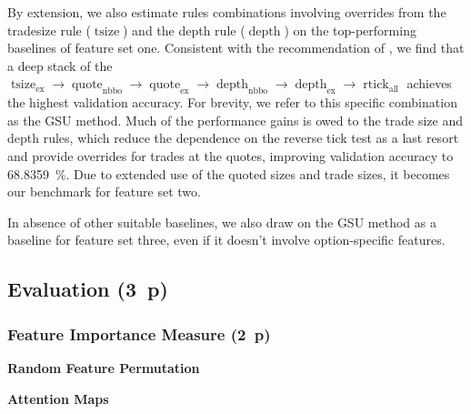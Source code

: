 By extension, we also estimate rules combinations involving overrides from the tradesize rule ($\operatorname{tsize}$) and the depth rule ($\operatorname{depth}$) on the top-performing baselines of feature set one. Consistent with the recommendation of \textcite[][14]{grauerOptionTradeClassification2022}, we find that a deep stack of the $\operatorname{tsize}_{\text{ex}} \to \operatorname{quote}_{\text{nbbo}} \to \operatorname{quote}_{\text{ex}} \to \operatorname{depth}_{\text{nbbo}} \to \operatorname{depth}_{\text{ex}} \to \operatorname{rtick}_{\text{all}}$ achieves the highest validation accuracy. For brevity, we refer to this specific combination as the \gls{GSU} method. Much of the performance gains is owed to the trade size and depth rules, which reduce the dependence on the reverse tick test as a last resort and provide overrides for trades at the quotes, improving validation accuracy to \SI{68.8359}{\percent}. Due to extended use of the quoted sizes and trade sizes, it becomes our benchmark for feature set two.  

In absence of other suitable baselines, we also draw on the \gls{GSU} method as a baseline for feature set three, even if it doesn't involve option-specific features.


\subsection{Evaluation (3~p)}\label{sec:evaluation}

\subsubsection{Feature Importance
    Measure (2~p)}\label{sec:feature-importance-measure}

\textbf{Random Feature Permutation}


\textbf{Attention Maps}

